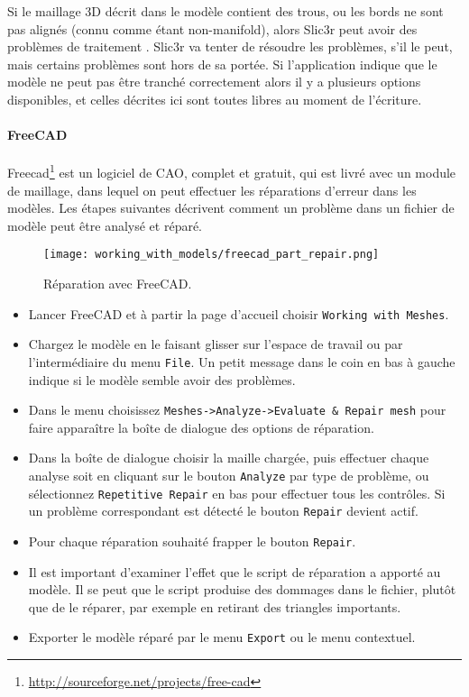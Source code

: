 
Si le maillage 3D d\'ecrit dans le mod\`ele contient des trous, ou les bords ne sont pas align\'es (connu comme \'etant non-manifold), alors Slic3r peut avoir des probl\`emes de traitement . Slic3r va tenter de r\'esoudre les probl\`emes, s'il le peut, mais certains probl\`emes sont hors de sa port\'ee. Si l'application indique que le mod\`ele ne peut pas \^etre tranch\'e correctement alors il y a plusieurs options disponibles, et celles d\'ecrites ici sont toutes libres au moment de l'\'ecriture.

{}

\paragraph{FreeCAD} %
\label{par:freecad}

Freecad\footnote{\url{http://sourceforge.net/projects/free-cad}} est un logiciel de CAO, complet et gratuit, qui est livr\'e avec un module de maillage, dans lequel on peut effectuer les r\'eparations d'erreur dans les mod\`eles. Les \'etapes suivantes d\'ecrivent comment un probl\`eme dans un fichier de mod\`ele peut \^etre analys\'e et r\'epar\'e.

\begin{figure}[H]
\centering
\texttt{[image: working\_with\_models/freecad\_part\_repair.png]}
\caption{R\'eparation avec FreeCAD.}
\label{fig:freecad_part_repair}
\end{figure}

\begin{itemize}
	\item Lancer FreeCAD et \`a partir la page d'accueil choisir \texttt{Working with Meshes}.
	\item Chargez le mod\`ele en le faisant glisser sur l'espace de travail ou par l'interm\'ediaire du menu \texttt{File}.  Un petit message dans le coin en bas \`a gauche indique si le mod\`ele semble avoir des probl\`emes.
	\item Dans le menu choisissez \texttt{Meshes->Analyze->Evaluate \& Repair mesh} pour faire appara\^itre la bo\^ite de dialogue des options de r\'eparation.
	\item Dans la bo\^ite de dialogue choisir la maille charg\'ee, puis effectuer chaque analyse soit en cliquant sur le bouton \texttt{Analyze} par type de probl\`eme, ou s\'electionnez \texttt{Repetitive Repair} en bas pour effectuer tous les contr\^oles. Si un probl\`eme  correspondant est d\'etect\'e le bouton \texttt{Repair} devient actif.
	\item Pour chaque r\'eparation souhait\'e frapper le bouton \texttt{Repair}.
	\item Il est important d'examiner l'effet que le script de r\'eparation a apport\'e au mod\`ele.  Il se peut que le script produise des dommages dans le fichier, plut\^ot que de le r\'eparer, par exemple en retirant des triangles importants.
	\item Exporter le mod\`ele r\'epar\'e par le menu \texttt{Export} ou le menu contextuel.
\end{itemize}
